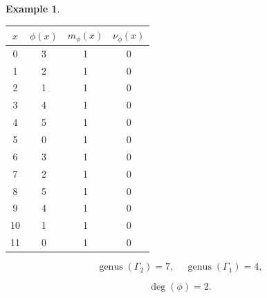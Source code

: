 \documentclass[12pt,letterpaper]{article}
\theoremstyle{definition}
\newtheorem{example}[theorem]{Example}
\DeclareMathOperator{\genus}{genus}
\begin{document}
\begin{example}
{\begin{center}
\begin{tabular}{c|c|c|c}  
  $x$ & $\phi(x)$ & $m_\phi(x)$ & $\nu_\phi(x)$ \\ \hline
  0   &    3   &        1         &  0   \\ 
  1   &    2   &        1         &  0   \\ 
  2   &    1   &        1         &  0   \\ 
  3   &    4   &        1         &  0   \\ 
  4   &    5   &        1         &  0   \\ 
  5   &    0   &        1         &  0    \\ 
  6   &    3   &        1         &  0   \\ 
  7   &    2   &        1         &  0   \\
  8   &    5   &        1         &  0   \\
  9   &    4   &        1         &  0   \\
  10  &    1   &        1         &  0   \\
  11  &    0   &        1         &  0   \\ 
\end{tabular}
\end{center}

\[
  \genus(\Gamma_2) =7,\ \ \ \ \
  \genus(\Gamma_1) =4,
\]

\[
\deg(\phi) =2.
\]


}
\end{example}
\end{document}
